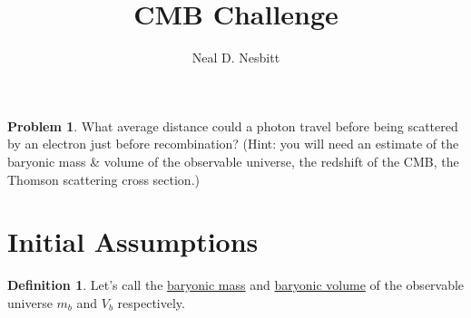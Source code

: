 \documentclass{article}
\title{CMB Challenge}
\author{Neal D. Nesbitt}
\theoremstyle{definition}
\newtheorem{problem}{Problem}
\theoremstyle{definition}
\newtheorem{definition}{Definition}[section]
\begin{document}
\maketitle

\setcounter{problem}{1}
\begin{problem}
What average distance could a photon travel before being scattered by an electron just before recombination? (Hint: you will need an estimate of the baryonic mass \& volume of the observable universe, the redshift of the CMB, the Thomson scattering cross section.)
\end{problem}

\section{Initial Assumptions}

\begin{definition}
Let's call the \underline{baryonic mass} and \underline{baryonic volume} of the observable universe $m_{b}$ and $V_{b}$ respectively.
\end{definition}
\end{document}
